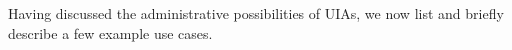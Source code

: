 Having discussed the administrative possibilities of UIAs, we now list and
briefly describe a few example use cases.
